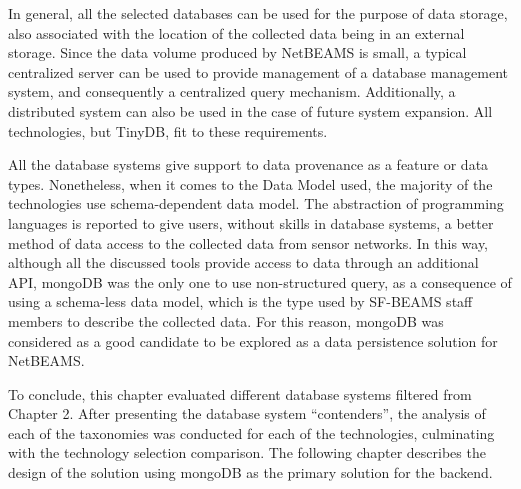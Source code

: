 In general, all the selected databases can be used for the purpose of data
storage, also associated with the location of the collected data being in an
external storage. Since the data volume produced by NetBEAMS is small, a
typical centralized server can be used to provide management of a database
management system, and consequently a centralized query mechanism. Additionally,
a distributed system can also be used in the case of future system expansion.
All technologies, but TinyDB, fit to these requirements.

All the database systems give support to data provenance as a feature or
data types. Nonetheless, when it comes to the Data Model used, the majority of
the technologies use schema-dependent data model. The abstraction of
programming languages is reported to give users, without skills in database
systems, a better method of data access to the collected data from sensor
networks. In this way, although all the discussed tools provide access to data
through an additional API, mongoDB was the only one to use non-structured
query, as a consequence of using a schema-less data model, which is the type
used by SF-BEAMS staff members to describe the collected data. For this reason,
mongoDB was considered as a good candidate to be explored as a data persistence
solution for NetBEAMS.

To conclude, this chapter evaluated different database systems filtered
from Chapter 2. After presenting the database system ``contenders'', the
analysis of each of the taxonomies was conducted for each of the technologies,
culminating with the technology selection comparison. The following chapter
describes the design of the solution using mongoDB as the primary solution for
the backend.
